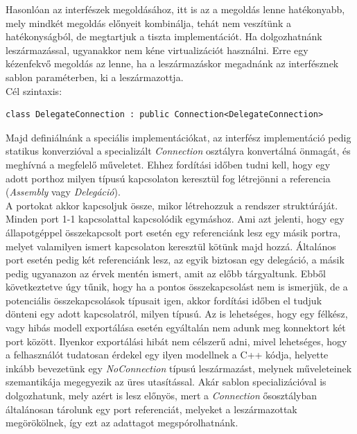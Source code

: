 \documentclass[a4paper,12pt]{report}
\begin{document}
Hasonlóan az interfészek megoldásához, itt is az a megoldás lenne hatékonyabb, mely mindkét megoldás előnyeit kombinálja, tehát nem veszítünk a hatékonyságból, de megtartjuk a tiszta implementációt. Ha dolgozhatnánk leszármazással, ugyanakkor nem kéne virtualizációt használni. Erre egy kézenfekvő megoldás az lenne, ha a leszármazáskor megadnánk az interfésznek sablon paraméterben, ki a leszármazottja. \\
Cél szintaxis:
\begin{lstlisting}
class DelegateConnection : public Connection<DelegateConnection>
\end{lstlisting}

Majd definiálnánk a speciális implementációkat, az interfész implementáció pedig statikus konverzióval a specializált \textit{Connection} osztályra konvertálná önmagát, és meghívná a megfelelő műveletet. Ehhez fordítási időben tudni kell, hogy egy adott porthoz milyen típusú kapcsolaton keresztül fog létrejönni a referencia (\textit{Assembly} vagy \textit{Delegáció}). \\ 
A portokat akkor kapcsoljuk össze, mikor létrehozzuk a rendszer struktúráját. Minden port 1-1 kapcsolattal kapcsolódik egymáshoz. Ami azt jelenti, hogy egy állapotgéppel összekapcsolt port esetén egy referenciánk lesz egy másik portra, melyet valamilyen ismert kapcsolaton keresztül kötünk majd hozzá. Általános port esetén pedig két referenciánk lesz, az egyik biztosan egy delegáció, a másik pedig ugyanazon az érvek mentén ismert, amit az előbb tárgyaltunk. Ebből következtetve úgy tűnik, hogy ha a pontos összekapcsolást nem is ismerjük, de a potenciális összekapcsolások típusait igen, akkor fordítási időben el tudjuk dönteni egy adott kapcsolatról, milyen típusú. Az is lehetséges, hogy egy félkész, vagy hibás modell exportálása esetén egyáltalán nem adunk meg konnektort két port között. Ilyenkor exportálási hibát nem célszerű adni, mivel lehetséges, hogy a felhasználót tudatosan érdekel egy ilyen modellnek a C++ kódja, helyette inkább bevezetünk egy \textit{NoConnection} típusú leszármazást, melynek műveleteinek szemantikája megegyezik az üres utasítással. Akár sablon specializációval is dolgozhatunk, mely azért is lesz előnyös, mert a \textit{Connection} ősosztályban általánosan tárolunk egy port referenciát, melyeket a leszármazottak megörökölnek, így ezt az adattagot megspórolhatnánk.
\end{document}
